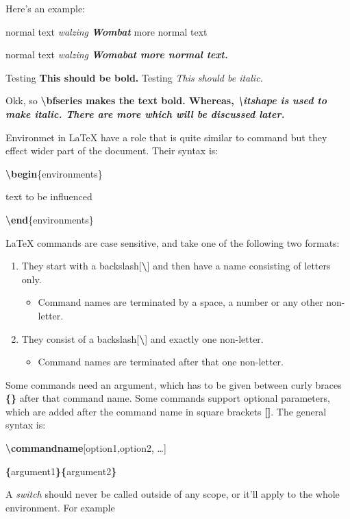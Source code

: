 \documentclass[12pt,a4paper,oneside]{article}
\begin{document}
Here's an example:

normal text {\itshape walzing \bfseries Wombat} more normal text

normal text \bgroup\itshape walzing \bfseries Womabat\egroup{} more normal text.

Testing {\bfseries This should be bold.}
Testing \bgroup\itshape This should be italic.\egroup{}

Okk, so \bgroup\bfseries \textbackslash{}bfseries makes the text bold\egroup{}. Whereas, \bgroup\itshape \textbackslash{}itshape is used to make italic\egroup{}. There are more which will be discussed later.

Environmet in {\LaTeX} have a role that is quite similar to command but they effect wider part of the document. Their syntax is:

\textbf{\textbackslash{}begin}\{environments\}

text to be influenced

\textbf{\textbackslash{}end}\{environments\}


{\LaTeX} commands are case sensitive, and take one of the following two formats:

\begin{enumerate}
	\item They start with a backslash[\textbf{\textbackslash{}}] and then have a name consisting of letters only.
		\begin{itemize}
			\item Command names are terminated by a space, a number or any other non-letter.
		\end{itemize}
	\item They consist of a backslash[\textbf{\textbackslash{}}] and exactly one non-letter.
		\begin{itemize}
			\item Command names are terminated after that one non-letter.
		\end{itemize}
\end{enumerate}

Some commands need an argument, which has to be given between curly braces \textbf{\{\}} after that command name. Some commands support optional parameters, which are added after the command name in square brackets \textbf{[]}. The general syntax is:

\textbf{\textbackslash{}commandname}[option1,option2, \ldots]

\textbf{\{}argument1\textbf{\}}\textbf{\{}argument2\textbf{\}}

A \textit{switch} should never be called outside of any scope, or it'll apply to the whole environment. For example
\end{document}
